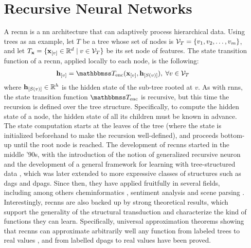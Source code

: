 \section{Recursive Neural Networks}
A \gls{recnn} \citep{sperduti1997generalizedneuron,frasconi1998general} is a \gls{nn} architecture that can adaptively process hierarchical data. Using trees as an example, let $T$ be a tree whose set of nodes is $\Cal{V}_T = \Set{v_1, v_2, \ldots, v_m}$, and let $T_{\Vector{x}} = \Set{\Elem{x}{v} \in \Real^d \mid v \in \Cal{V}_T}$ be its set node of features. The state transition function of a \gls{recnn}, applied locally to each node, is the following:
\begin{align*}
    \Elem{h}{v} &= \Transduction_{\Fun{enc}}(\Elem{x}{v}, \Elem{h}{S(v)}), \; \forall v \in \Cal{V}_T
\end{align*}
where $\Elem{h}{S(v)} \in \Real^h$ is the hidden state of the sub-tree rooted at $v$. As with \glspl{rnn}, the state transition function $\Transduction_{\Fun{enc}}$ is recursive, but this time the recursion is defined over the tree structure. Specifically, to compute the hidden state of a node, the hidden state of all its children must be known in advance. The state computation starts at the leaves of the tree (where the state is initialized beforehand to make the recursion well-defined), and proceeds bottom-up until the root node is reached.
The development of \glspl{recnn} started in the middle '90s, with the introduction of the notion of generalized recursive neuron \citep{sperduti1997generalizedneuron} and the development of a general framework for learning with tree-structured data \citep{frasconi1998general}, which was later extended to more expressive classes of structures such as \glspl{dag} and \glspl{dpag}. Since then, they have applied fruitfully in several fields, including among others cheminformatics \citep{micheli2007introductionrecnncheminformatics}, sentiment analysis \citep{socher2013recnnsentiment} and scene parsing \citep{socher2011parsingscenes}. Interestingly, \glspl{recnn} are also backed up by strong theoretical results, which support the generality of the structural transduction and characterize the kind of functions they can learn. Specifically, universal approximation theorems showing that \glspl{recnn} can approximate arbitrarily well any function from labeled trees to real values \citep{hammer1999recnn}, and from labelled \glspl{dpag} to real values \citep{hammer2005universal} have been proved.

